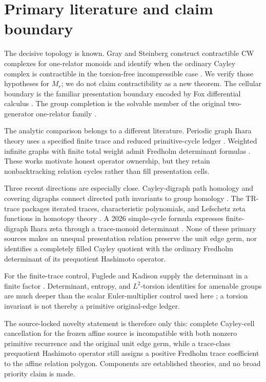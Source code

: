 \section{Primary literature and claim boundary}
\label{sec:literature}

The decisive topology is known.  Gray and Steinberg construct contractible
CW complexes for one-relator monoids and identify when the ordinary Cayley
complex is contractible in the torsion-free incompressible case
\citep{GraySteinberg2022}.  We verify those hypotheses for $M_r$; we do not
claim contractibility as a new theorem.  The cellular boundary is the familiar
presentation boundary encoded by Fox differential calculus
\citep{Fox1953}.  The group completion is the solvable member of the original
two-generator one-relator family \citep{BaumslagSolitar1962}.

The analytic comparison belongs to a different literature.  Periodic graph
Ihara theory uses a specified finite trace and reduced primitive-cycle ledger
\citep{GuidoIsolaLapidus2008}.  Weighted infinite graphs with finite total
weight admit Fredholm determinant formulas \citep{Deitmar2015}.  These works
motivate honest operator ownership, but they retain nonbacktracking relation
cycles rather than fill presentation cells.

Three recent directions are especially close.  Cayley-digraph path homology
and covering digraphs connect directed path invariants to group homology
\citep{DiEtAl2024}.  The TR-trace packages iterated traces, characteristic
polynomials, and Lefschetz zeta functions in homotopy theory
\citep{CampbellEtAl2025}.  A 2026 simple-cycle formula expresses finite-digraph
Ihara zeta through a trace-monoid determinant \citep{Watanabe2026}.  None of
these primary sources makes an unequal presentation relation preserve the
unit edge germ, nor identifies a completely filled Cayley quotient with the
ordinary Fredholm determinant of its prequotient Hashimoto operator.

For the finite-trace control, Fuglede and Kadison supply the determinant in a
finite factor \citep{FugledeKadison1952}.  Determinant, entropy, and
$L^2$-torsion identities for amenable groups are much deeper than the scalar
Euler-multiplier control used here \citep{LiThom2014}; a torsion invariant is
not thereby a primitive original-edge ledger.

The source-locked novelty statement is therefore only this: complete
Cayley-cell cancellation for the frozen affine source is incompatible with
both nonzero primitive recurrence and the original unit edge germ, while a
trace-class prequotient Hashimoto operator still assigns a positive Fredholm
trace coefficient to the affine relation polygon.  Components are established
theories, and no broad priority claim is made.

